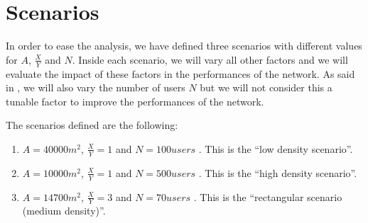 \section{Scenarios}\label{sec:scenarios}

In order to ease the analysis, we have defined three scenarios with different
values for \(A\), \(\frac{X}{Y}\) and \(N\). Inside each scenario, we will vary
all other factors and we will evaluate the impact of these factors in the
performances of the network. As said in , we will also vary
the number of users \(N\) but we will not consider this a tunable factor to
improve the performances of the network.

The scenarios defined are the following:
\begin{enumerate}
	\item \(A = 40000m^2\), \(\frac{X}{Y} = 1\)  and \(N = 100\mathit{users}\) . This is the ``low density
		scenario''.
	\item \(A = 10000m^2\), \(\frac{X}{Y} = 1\)  and \(N = 500\mathit{users}\) . This is the ``high density
		scenario''.
	\item \(A = 14700m^2\), \(\frac{X}{Y} = 3\)  and \(N = 70\mathit{users}\) .  This is the ``rectangular
		scenario (medium density)''.
\end{enumerate}


